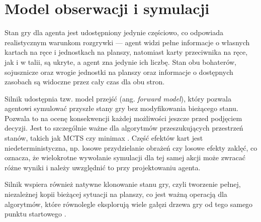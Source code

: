 \section{Model obserwacji i symulacji}

Stan gry dla agenta jest udostępniony jedynie częściowo, co odpowiada realistycznym warunkom rozgrywki --- agent widzi pełne informacje o własnych kartach na ręce i jednostkach na planszy, natomiast karty przeciwnika na ręce, jak i w talii, są ukryte, a agent zna jedynie ich liczbę. Stan obu bohaterów, sojusznicze oraz wrogie jednostki na planszy oraz informacje o dostępnych zasobach są widoczne przez cały czas dla obu stron.

Silnik udostępnia tzw. model przejść (ang. \textit{forward model}), który pozwala agentowi symulować przyszłe stany gry bez modyfikowania bieżącego stanu. Pozwala to na ocenę konsekwencji każdej możliwości jeszcze przed podjęciem decyzji. Jest to szczególnie ważne dla algorytmów przeszukujących przestrzeń stanów, takich jak MCTS czy minimax \cite{Browne2012}. Część efektów kart jest niedeterministyczna, np. losowe przydzielanie obrażeń czy losowe efekty zaklęć, co oznacza, że wielokrotne wywołanie symulacji dla tej samej akcji może zwracać różne wyniki i należy  uwzględnić to przy projektowaniu agenta.

Silnik wspiera również natywne klonowanie stanu gry, czyli tworzenie pełnej, niezależnej kopii bieżącej sytuacji na planszy, co jest ważną operacją dla algorytmów, które równolegle eksplorują wiele gałęzi drzewa gry od tego samego punktu startowego \cite{sabberstone_hearthsim}.
